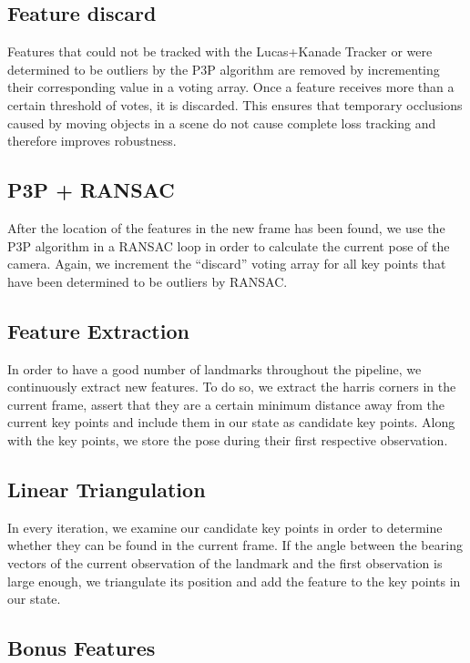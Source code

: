 \documentclass[11pt]{article}
\begin{document}
\subsection{Feature discard}
Features that could not be tracked with the Lucas+Kanade Tracker or were determined to be outliers by the P3P algorithm are removed by incrementing their corresponding value in a voting array. Once a feature receives more than a certain threshold of votes, it is discarded. This ensures that temporary occlusions caused by moving objects in a scene do not cause complete loss tracking and therefore improves robustness.

\subsection{P3P + RANSAC}
After the location of the features in the new frame has been found, we use the P3P algorithm in a RANSAC loop in order to calculate the current pose of the camera. Again, we increment the “discard” voting array for all key points that have been determined to be outliers by RANSAC.

\subsection{Feature Extraction}
In order to have a good number of landmarks throughout the pipeline, we continuously extract new features. To do so, we extract the harris corners in the current frame, assert that they are a certain minimum distance away from the current key points and include them in our state as candidate key points. Along with the key points, we store the pose during their first respective observation.

\subsection{Linear Triangulation} 
In every iteration, we examine our candidate key points in order to determine whether they can be found in the current frame. If the angle between the bearing vectors of the current observation of the landmark and the first observation is large enough, we triangulate its position and add the feature to the key points in our state.

\subsection{Bonus Features}
\end{document}

